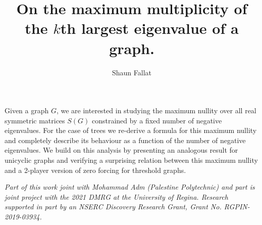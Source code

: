 \documentclass[a4paper]{amsart}
\date{}
\begin{document}
\title{On the maximum multiplicity of the $k$th largest eigenvalue of a graph.}
\author{Shaun Fallat} %
\address{University of Regina} %


\maketitle


Given a graph $G$, we are interested in studying the maximum nullity over all real symmetric matrices $S(G)$ constrained by a fixed number of negative eigenvalues. For the case of trees we re-derive a formula for this maximum nullity and completely describe its behaviour as a function of the number of negative eigenvalues. We build on this analysis by presenting an analogous result for unicyclic graphs and verifying a surprising relation between this maximum nullity and a 2-player version of zero forcing for threshold graphs.


\emph{Part of this work joint with Mohammad Adm (Palestine Polytechnic) and part is joint project with the 2021 DMRG at the University of Regina.
Research supported in part by an NSERC Discovery Research Grant, Grant No. RGPIN-2019-03934.}
\end{document}
